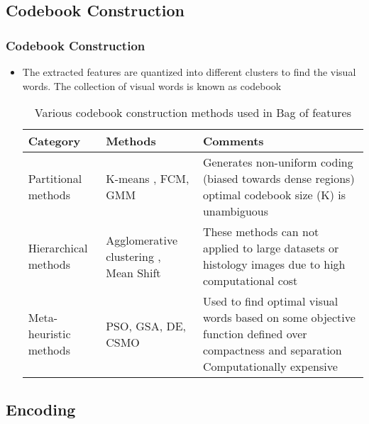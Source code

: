 \documentclass [9pt,times] {beamer}
\begin{document}
\subsection{Codebook Construction}\label{CC}
\begin{frame}\frametitle{Codebook Construction}
\begin{itemize}
\item The extracted features are quantized into different clusters to find the visual words. The collection of visual words is known as \textcolor[rgb]{0.00,0.00,1.00}{codebook}

\begin{block}{}
\begin{table}[!t]

\renewcommand{\arraystretch}{1.5}
\caption{Various codebook construction methods used in Bag of features \cite{jurie2005}}
\label{Tab:clustering}
\centering
\scriptsize{
\begin{tabular}{p{1.2cm}|p{1.9cm}|p{4.8cm}}
	 \hline
	 \justifying
	\textbf{Category} &\textbf{Methods}  &  \textbf{Comments}\\
	 \hline 
	Partitional methods & K-means \cite{jurie2005, caicedo2009, saygili2015}, FCM, GMM \cite{saygili2015}  & Generates non-uniform coding (biased towards dense regions) \newline optimal codebook size (K) is unambiguous\\

Hierarchical methods & Agglomerative clustering \cite{agarwal2004, leibe2006}, Mean Shift \cite{georgescu2003} & These methods can not applied to large datasets or histology images due to high computational cost \\

Meta-heuristic methods & PSO, GSA, DE, CSMO \cite{kumar2018} & Used to find optimal visual words based on some objective function defined over compactness and separation \newline Computationally expensive \\


\hline
\end{tabular}
}
\end{table}
\end{block}
\end{itemize}
\end{frame}



\subsection{Encoding}\label{Encoding}
\end{document}
